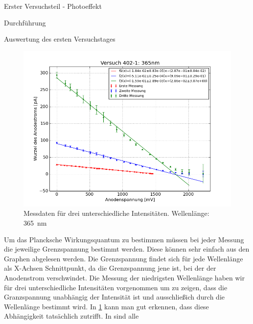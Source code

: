\documentclass[pdftex, a4paper,11pt, twoside, ngerman]{report}
\begin{document}
\begin{chapter}{Erster Versuchsteil - Photoeffekt}
\begin{section}{Durchführung}
    \end{section}
    
    
    
    \begin{section}{Auswertung des ersten Versuchstages}
      \label{chp:Photoeffekt:sec:Auswertung}
      \begin{figure}[b!]
        \begin{center}
          \includegraphics[width=\textwidth]{Figures/Versuch402_1_365.png}
          \caption{Messdaten für drei unterschiedliche Intensitäten.
              Wellenlänge: \SI{365}{\nano\meter}}
          \label{fig:Versuch402_1_365}
        \end{center}
      \end{figure}
      Um das Plancksche Wirkungsquantum zu bestimmen müssen bei jeder Messung
      die jeweilige Grenzspannung bestimmt werden. Diese können sehr einfach 
      aus den Graphen abgelesen werden. Die Grenzspannung findet sich für jede 
      Wellenlänge als X-Achsen Schnittpunkt, da die Grenzspannung jene ist, 
      bei der der Anodenstrom verschwindet. Die Messung der niedrigsten 
      Wellenlänge haben wir für drei unterschiedliche Intensitäten vorgenommen 
      um zu zeigen, dass die Granzspannung unabhängig der Intensität ist und 
      ausschließich durch die Wellenlänge bestimmt wird. In 
      \cref{fig:Versuch402_1_365} kann man gut erkennen, dass diese 
      Abhängigkeit tatsächlich zutrifft. In 
       sind alle 

\end{section}
\end{chapter}
\end{document}
